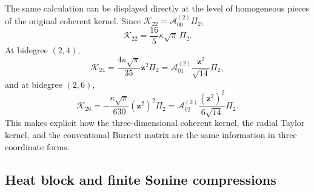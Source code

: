 \documentclass[11pt]{article}
\numberwithin{equation}{section}
\theoremstyle{definition}
\begin{document}
The same calculation can be displayed directly at the level of homogeneous
pieces of the original coherent kernel.  Since
$\mathcal K_{22}=\mathcal A^{(2)}_{00}\Pi_2$,
\begin{equation}
 \mathcal K_{22}
 =\frac{16}{5}\kappa\sqrt\pi\,\Pi_2.
\end{equation}
At bidegree $(2,4)$,
\begin{equation}
 \mathcal K_{24}
 =\frac{4\kappa\sqrt\pi}{35}\bm z^2\Pi_2
 =\mathcal A^{(2)}_{01}\frac{\bm z^2}{\sqrt{14}}\Pi_2,
\end{equation}
and at bidegree $(2,6)$,
\begin{equation}
 \mathcal K_{26}
 =-\frac{\kappa\sqrt\pi}{630}(\bm z^2)^2\Pi_2
 =\mathcal A^{(2)}_{02}
 \frac{(\bm z^2)^2}{6\sqrt{14}}\Pi_2.
\end{equation}
This makes explicit how the three-dimensional coherent kernel, the radial
Taylor kernel, and the conventional Burnett matrix are the same information
in three coordinate forms.

\subsection{Heat block and finite Sonine compressions}
\end{document}

